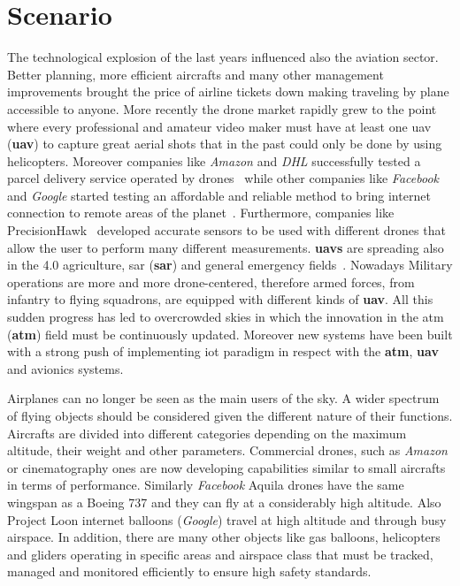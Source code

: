 \documentclass[../main.tex]{subfiles}
\begin{document}
\chapter{Scenario}
\label{chap:avionicsprot}

The technological explosion of the last years influenced also the aviation
sector. Better planning, more efficient aircrafts and many other management
improvements brought the price of airline tickets down making traveling by plane
accessible to anyone. More recently the drone market rapidly grew to the point
where every professional and amateur video maker must have at least one
\acrlong{uav} (\textbf{\acrshort{uav}}) to capture great aerial shots that in
the past could only be done by using helicopters. Moreover companies like
\textit{Amazon} and \textit{DHL} successfully tested a parcel delivery service
operated by drones~\cite{primeair} while other companies like \textit{Facebook}
and \textit{Google} started testing an affordable and reliable method to bring
internet connection to remote areas of the planet~\cite{loon}. Furthermore,
companies like PrecisionHawk~\cite{prechwk} developed accurate sensors to be
used with different drones that allow the user to perform many different
measurements. \textbf{\acrshort{uav}s} are spreading also in the 4.0
agriculture, \acrlong{sar} (\textbf{\acrshort{sar}}) and general emergency
fields~\cite{vvff}. Nowadays Military operations are more and more
drone-centered, therefore armed forces, from infantry to flying squadrons, are
equipped with different kinds of \textbf{\acrshort{uav}}. All this sudden
progress has led to overcrowded skies in which the innovation in the
\acrlong{atm} (\textbf{\acrshort{atm}}) field must be continuously updated. Moreover new systems have been built with a strong push of implementing \acrshort{iot} paradigm in respect with the \textbf{\acrshort{atm}}, \textbf{\acrshort{uav}} and avionics systems.

Airplanes can no longer be seen as the main users of the sky. A wider spectrum
of flying objects should be considered given the different nature of their
functions. Aircrafts are divided into different categories depending on the
maximum altitude, their weight and other parameters. Commercial drones, such as
\textit{Amazon} or cinematography ones are now developing capabilities similar
to small aircrafts in terms of performance. Similarly \textit{Facebook} Aquila
drones have the same wingspan as a Boeing 737 and they can fly at a considerably
high altitude\cite{fbaquila}. Also Project Loon internet balloons
(\textit{Google}) travel at high altitude and through busy airspace. In
addition, there are many other objects like gas balloons, helicopters and
gliders operating in specific areas and airspace class that must be tracked,
managed and monitored efficiently to ensure high safety standards.
\end{document}
